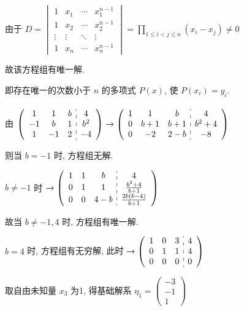 		由于 \( D = \begin{vmatrix}
			1      & x_{1}  & \cdots & x_{1}^{n-1} \\
			1      & x_{2}  & \cdots & x_{2}^{n-1} \\
			\vdots & \vdots & \ddots & \vdots      \\
			1      & x_{n}  & \cdots & x_{n}^{n-1}
		\end{vmatrix} = \prod_{1 \leq i < j \leq n} (x_{i}-x_{j}) \neq 0 \)

		故该方程组有唯一解.

		即存在唯一的次数小于 \( n \) 的多项式 \( P(x) \), 使 \( P(x_{i}) = y_{i} \).


	\paragraph{} %
		由 \( \left(\begin{array}{ccc:c}
				1  & 1  & b & 4     \\
				-1 & b  & 1 & b^{2} \\
				1  & -1 & 2 & -4
			\end{array}\right) \rightarrow \left(\begin{array}{ccc:c}
				1 & 1   & b   & 4       \\
				0 & b+1 & b+1 & b^{2}+4 \\
				0 & -2  & 2-b & -8
			\end{array}\right) \)

		则当 \( b = -1 \) 时, 方程组无解.

		\( b \neq -1 \) 时 \( \rightarrow \left(\begin{array}{ccc:c}
				1 & 1 & b   & 4                   \\
				0 & 1 & 1   & \frac{b^{2}+4}{b+1} \\
				0 & 0 & 4-b & \frac{2b(b-4)}{b+1}
			\end{array}\right) \)

		故当 \( b \neq -1, 4 \) 时, 方程组有唯一解.

		\( b = 4 \) 时, 方程组有无穷解, 此时 \( \rightarrow \left(\begin{array}{ccc:c}
				1 & 0 & 3 & 4 \\
				0 & 1 & 1 & 4 \\
				0 & 0 & 0 & 0
			\end{array}\right) \)

		取自由未知量 \( x_{3} \) 为1, 得基础解系 \( \eta_{1} = \begin{pmatrix}
			-3 \\
			-1 \\
			1
		\end{pmatrix} \)

